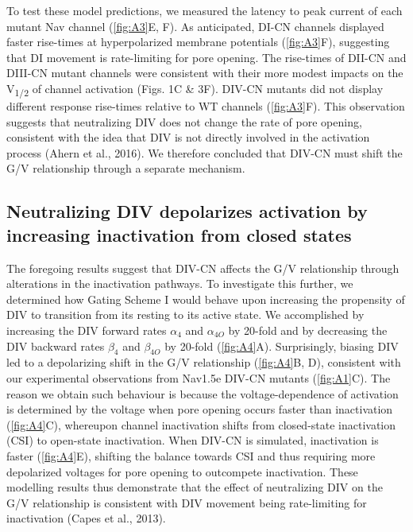 To test these model predictions, we measured the latency to peak current of each mutant Nav channel (\autoref{fig:A3}E, F). As anticipated, DI-CN channels displayed faster rise-times at hyperpolarized membrane potentials (\autoref{fig:A3}F), suggesting that DI movement is rate-limiting for pore opening. The rise-times of DII-CN and DIII-CN mutant channels were consistent with their more modest impacts on the V\textsubscript{1/2} of channel activation (Figs. 1C \& 3F). DIV-CN mutants did not display different response rise-times relative to WT channels (\autoref{fig:A3}F). This observation suggests that neutralizing DIV does not change the rate of pore opening, consistent with the idea that DIV is not directly involved in the activation process (Ahern et al., 2016). We therefore concluded that DIV-CN must shift the G/V relationship through a separate mechanism.

\subsection{Neutralizing DIV depolarizes activation by increasing inactivation from closed states}
The foregoing results suggest that DIV-CN affects the G/V relationship through alterations in the inactivation pathways. To investigate this further, we determined how Gating Scheme I would behave upon increasing the propensity of DIV to transition from its resting to its active state. We accomplished by increasing the DIV forward rates $\alpha_4$ and $\alpha_{4O}$ by 20-fold and by decreasing the DIV backward rates $\beta_4$ and $\beta_{4O}$ by 20-fold (\autoref{fig:A4}A). Surprisingly, biasing DIV led to a depolarizing shift in the G/V relationship (\autoref{fig:A4}B, D), consistent with our experimental observations from Nav1.5e DIV-CN mutants (\autoref{fig:A1}C). The reason we obtain such behaviour is because the voltage-dependence of activation is determined by the voltage when pore opening occurs faster than inactivation (\autoref{fig:A4}C), whereupon channel inactivation shifts from closed-state inactivation (CSI) to open-state inactivation. When DIV-CN is simulated, inactivation is faster (\autoref{fig:A4}E), shifting the balance towards CSI and thus requiring more depolarized voltages for pore opening to outcompete inactivation. These modelling results thus demonstrate that the effect of neutralizing DIV on the G/V relationship is consistent with DIV movement being rate-limiting for inactivation (Capes et al., 2013).

